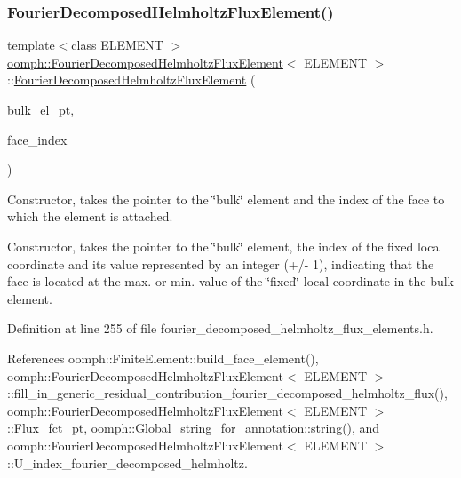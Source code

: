\subsubsection{\texorpdfstring{Fourier\+Decomposed\+Helmholtz\+Flux\+Element()}{FourierDecomposedHelmholtzFluxElement()}\hspace{0.1cm}{\footnotesize\ttfamily [1/3]}}
{\footnotesize\ttfamily template$<$class E\+L\+E\+M\+E\+NT $>$ \\
\hyperlink{classoomph_1_1FourierDecomposedHelmholtzFluxElement}{oomph\+::\+Fourier\+Decomposed\+Helmholtz\+Flux\+Element}$<$ E\+L\+E\+M\+E\+NT $>$\+::\hyperlink{classoomph_1_1FourierDecomposedHelmholtzFluxElement}{Fourier\+Decomposed\+Helmholtz\+Flux\+Element} (\begin{DoxyParamCaption}\item[{\hyperlink{classoomph_1_1FiniteElement}{Finite\+Element} $\ast$const \&}]{bulk\+\_\+el\+\_\+pt,  }\item[{const int \&}]{face\+\_\+index }\end{DoxyParamCaption})}



Constructor, takes the pointer to the \char`\"{}bulk\char`\"{} element and the index of the face to which the element is attached. 

Constructor, takes the pointer to the \char`\"{}bulk\char`\"{} element, the index of the fixed local coordinate and its value represented by an integer (+/-\/ 1), indicating that the face is located at the max. or min. value of the \char`\"{}fixed\char`\"{} local coordinate in the bulk element. 

Definition at line 255 of file fourier\+\_\+decomposed\+\_\+helmholtz\+\_\+flux\+\_\+elements.\+h.



References oomph\+::\+Finite\+Element\+::build\+\_\+face\+\_\+element(), oomph\+::\+Fourier\+Decomposed\+Helmholtz\+Flux\+Element$<$ E\+L\+E\+M\+E\+N\+T $>$\+::fill\+\_\+in\+\_\+generic\+\_\+residual\+\_\+contribution\+\_\+fourier\+\_\+decomposed\+\_\+helmholtz\+\_\+flux(), oomph\+::\+Fourier\+Decomposed\+Helmholtz\+Flux\+Element$<$ E\+L\+E\+M\+E\+N\+T $>$\+::\+Flux\+\_\+fct\+\_\+pt, oomph\+::\+Global\+\_\+string\+\_\+for\+\_\+annotation\+::string(), and oomph\+::\+Fourier\+Decomposed\+Helmholtz\+Flux\+Element$<$ E\+L\+E\+M\+E\+N\+T $>$\+::\+U\+\_\+index\+\_\+fourier\+\_\+decomposed\+\_\+helmholtz.

\mbox{\label{classoomph_1_1FourierDecomposedHelmholtzFluxElement_a1fe214ab48deafae7c645c442a1c246d}} 
